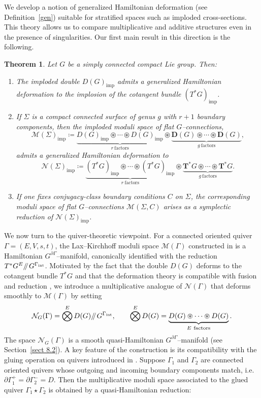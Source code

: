 \documentclass[reqno]{amsart}
\theoremstyle{plain}
\newtheorem{Thm}{Theorem}[section]
\theoremstyle{definition}
\newcommand{\M}{\mathcal{M}}
\newcommand{\N}{\mathcal{N}}
\newcommand{\sll}[1]{\mkern-4mu\mathbin{/\mkern-5mu/}_{\mkern-4mu{#1}}}
\begin{document}
We develop a notion of generalized Hamiltonian deformation (see Definition~\ref{gen}) suitable for stratified spaces such as imploded cross-sections. This theory allows us to compare multiplicative and additive structures even in the presence of singularities. Our first main result in this direction is the following.

\begin{Thm}\label{Thm 1.6}
Let $G$ be a simply connected compact Lie group. Then:
\begin{enumerate}
\item The imploded double $D(G)_{\mathrm{imp}}$ admits a generalized Hamiltonian deformation to the implosion of the cotangent bundle $(T^{*}G)_{\mathrm{imp}}$.
\item If $\Sigma$ is a compact connected surface of genus $g$ with $r+1$ boundary components, then the imploded moduli space of flat $G$--connections,
\[
\mathcal{M}(\Sigma)_{\mathrm{imp}}
\coloneqq
\underbrace{D(G)_{\mathrm{imp}}\circledast\cdots\circledast D(G)_{\mathrm{imp}}}_{r\ \text{factors}}
\circledast
\underbrace{\mathbf{D}(G)\circledast\cdots\circledast \mathbf{D}(G)}_{g\ \text{factors}},
\]
admits a generalized Hamiltonian deformation to
\[
\mathcal{N}(\Sigma)_{\mathrm{imp}}
\coloneqq
\underbrace{(T^{*}G)_{\mathrm{imp}}\circledast\cdots\circledast (T^{*}G)_{\mathrm{imp}}}_{r\ \text{factors}}
\circledast
\underbrace{\mathbf{T}^{*}G\circledast\cdots\circledast \mathbf{T}^{*}G}_{g\ \text{factors}}.
\]
\item If one fixes conjugacy-class boundary conditions $C$ on $\Sigma$, the corresponding moduli space of flat $G$--connections $\M(\Sigma,C)$ arises as a symplectic reduction of $\mathcal{N}(\Sigma)_{\mathrm{imp}}$.
\end{enumerate}
\end{Thm}

We now turn to the quiver-theoretic viewpoint. For a connected oriented quiver $\Gamma=(E,V,s,t)$, the Lax--Kirchhoff moduli space $\mathcal{M}(\Gamma)$ constructed in \cite[Theorem~3.1, Theorem~5.2]{maiza2025lax} is a Hamiltonian $G^{\partial\Gamma}$--manifold, canonically identified with the reduction $T^{*}G^{E}\sll{} G^{\Gamma_{\mathrm{int}}}$. Motivated by the fact that the double $D(G)$ deforms to the cotangent bundle $T^{*}G$ and that the deformation theory is compatible with fusion and reduction \cite[Theorem~3.3, Corollary~3.2]{JMM2025deformations}, we introduce a multiplicative analogue of $\N(\Gamma)$ that deforms smoothly to $\M(\Gamma)$ by setting
\[
\mathcal{N}_{G}(\Gamma)
=
\bigotimes^{E} D(G)\sll{} G^{\Gamma_{\mathrm{int}}},
\qquad
\bigotimes^{E} D(G)
=
\underbrace{D(G)\circledast\cdots\circledast D(G)}_{E\ \text{factors}}.
\]
The space $\mathcal{N}_{G}(\Gamma)$ is a smooth quasi-Hamiltonian $G^{\partial\Gamma}$--manifold (see Section~\ref{sect 8.2}). 
A key feature of the construction is its compatibility with the gluing operation on quivers introduced in \cite[Section~6]{maiza2025lax}. Suppose $\Gamma_{1}$ and $\Gamma_{2}$ are connected oriented quivers whose outgoing and incoming boundary components match, i.e.\ $\partial\Gamma_{1}^{+}=\partial\Gamma_{2}^{-}=D$. Then the multiplicative moduli space associated to the glued quiver $\Gamma_{1}\star\Gamma_{2}$ is obtained by a quasi-Hamiltonian reduction:
\end{document}
